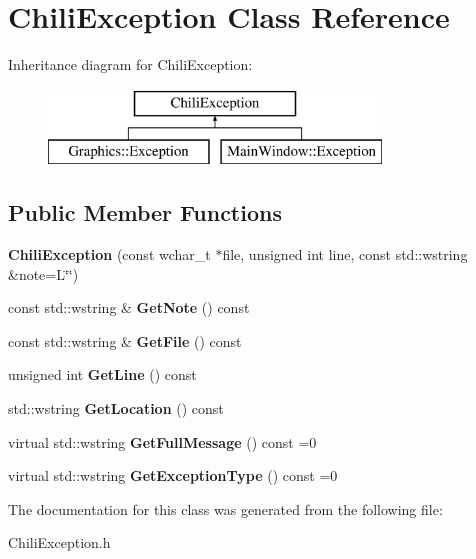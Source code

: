 \hypertarget{class_chili_exception}{}\section{Chili\+Exception Class Reference}
\label{class_chili_exception}
Inheritance diagram for Chili\+Exception\+:\begin{figure}[H]
\begin{center}
\leavevmode
\includegraphics[height=2.000000cm]{class_chili_exception}
\end{center}
\end{figure}
\subsection*{Public Member Functions}
\begin{DoxyCompactItemize}
\item 
\mbox{\label{class_chili_exception_ab08ab747307f2a3116b61d8c56e6287b}} 
{\bfseries Chili\+Exception} (const wchar\+\_\+t $\ast$file, unsigned int line, const std\+::wstring \&note=L\char`\"{}\char`\"{})
\item 
\mbox{\label{class_chili_exception_ac91c28909ddc75b51afeef77f971fda6}} 
const std\+::wstring \& {\bfseries Get\+Note} () const
\item 
\mbox{\label{class_chili_exception_a6ec0a02f643f907e01df8c297f0e52bf}} 
const std\+::wstring \& {\bfseries Get\+File} () const
\item 
\mbox{\label{class_chili_exception_a0acc5bd63c23bee4354ddcea9be2e7e1}} 
unsigned int {\bfseries Get\+Line} () const
\item 
\mbox{\label{class_chili_exception_ab871cd7426216808049fd7fb4c4413e0}} 
std\+::wstring {\bfseries Get\+Location} () const
\item 
\mbox{\label{class_chili_exception_a1d3f4e1c02fa769c64f8d3439b60436f}} 
virtual std\+::wstring {\bfseries Get\+Full\+Message} () const =0
\item 
\mbox{\label{class_chili_exception_adc6a2ae915cdb20d5a161cdc78f43f9b}} 
virtual std\+::wstring {\bfseries Get\+Exception\+Type} () const =0
\end{DoxyCompactItemize}


The documentation for this class was generated from the following file\+:\begin{DoxyCompactItemize}
\item 
Chili\+Exception.\+h\end{DoxyCompactItemize}
